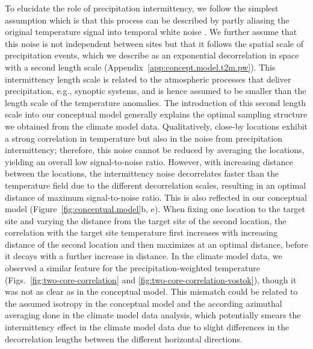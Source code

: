 \documentclass[draft]{agujournal2019}
\begin{document}
To elucidate the role of precipitation intermittency, we follow the simplest
assumption which is that this process can be described by partly aliasing the
original temperature signal into temporal white noise
\cite{Laepple2018,Casado2020}. We further assume that this noise is not
independent between sites but that it follows the spatial scale of precipitation
events, which we describe as an exponential decorrelation in space with a second
length scale (Appendix~\ref{app:concept.model.t2m.pw}). This intermittency
length scale is related to the atmospheric processes that deliver precipitation,
e.g., synoptic systems, and is hence assumed to be smaller than the length scale
of the temperature anomalies. The introduction of this second length scale into
our conceptual model generally explains the optimal sampling structure we
obtained from the climate model data. Qualitatively, close-by locations exhibit
a strong correlation in temperature but also in the noise from precipitation
intermittency; therefore, this noise cannot be reduced by averaging the
locations, yielding an overall low signal-to-noise ratio. However, with
increasing distance between the locations, the intermittency noise decorrelates
faster than the temperature field due to the different decorrelation scales,
resulting in an optimal distance of maximum signal-to-noise ratio. This is also
reflected in our conceptual model (Figure~\ref{fig:conceptual.model}b, e). When
fixing one location to the target site and varying the distance from the target
site of the second location, the correlation with the target site temperature
first increases with increasing distance of the second location and then
maximizes at an optimal distance, before it decays with a further increase in
distance. In the climate model data, we observed a similar feature for the
precipitation-weighted temperature (Figs.~\ref{fig:two-core-correlation} and
\ref{fig:two-core-correlation-vostok}), though it was not as clear as in the
conceptual model. This mismatch could be related to the assumed isotropy in the
conceptual model and the according azimuthal averaging done in the climate model
data analysis, which potentially smears the intermittency effect in the climate
model data due to slight differences in the decorrelation lengths between the
different horizontal directions.
\end{document}
